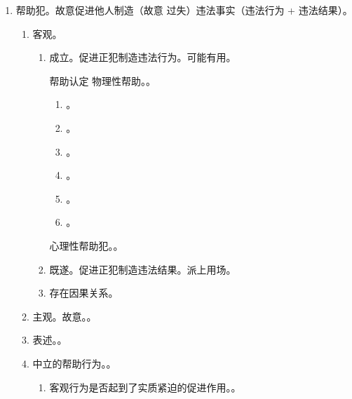 \begin{enumerate}
\begin{enumerate}
          \item 处罚。稍微了解即可。
        \end{enumerate}
  \item 帮助犯。故意促进他人制造（故意 \hz 过失）违法事实（违法行为 + 违法结果）。
        \begin{enumerate}
          \item 客观。
                \begin{enumerate}
                  \item 成立。促进正犯制造违法行为。可能有用。
                        \begin{kk}{帮助认定}
                          物理性帮助。。
                          \begin{enumerate}
                            \item {}。
                            \item {}。
                            \item {}。
                            \item {}。
                            \item {}。
                            \item {}。
                          \end{enumerate}
                          \tcblower
                          心理性帮助犯。。
                        \end{kk}
                  \item 既遂。促进正犯制造违法结果。派上用场。
                  \item 存在因果关系。
                \end{enumerate}
          \item 主观。故意。。
          \item 表述。。
          \item 中立的帮助行为。。
                \begin{enumerate}
                  \item 客观行为是否起到了实质紧迫的促进作用。。

\end{enumerate}
\end{enumerate}
\end{enumerate}
